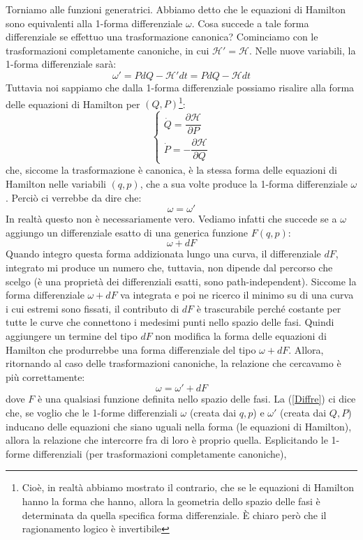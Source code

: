\documentclass[a4paper,openany]{article}
\begin{document}
Torniamo alle funzioni generatrici. Abbiamo detto che le equazioni di Hamilton sono equivalenti alla 1-forma differenziale $\omega$. Cosa succede a tale forma differenziale se effettuo una trasformazione canonica? Cominciamo con le trasformazioni completamente canoniche, in cui $\mathcal{H}' = \mathcal{H}$. Nelle nuove variabili, la 1-forma differenziale sarà:
$$
\omega' = PdQ-\mathcal{H}'dt =  PdQ-\mathcal{H}dt
$$
Tuttavia noi sappiamo che dalla 1-forma differenziale possiamo risalire alla forma delle equazioni di Hamilton per $(Q,P)$\footnote{Cioè, in realtà abbiamo mostrato il contrario, che se le equazioni di Hamilton hanno la forma che hanno, allora la geometria dello spazio delle fasi è determinata da quella specifica forma differenziale. È chiaro però che il ragionamento logico è invertibile}:
\begin{equation}\label{key}
	\begin{cases}
		\dot{Q} = \dfrac{\partial \mathcal{H}}{\partial P} \\
		\dot{P} = -\dfrac{\partial \mathcal{H}}{\partial Q}
	\end{cases}
\end{equation}
che, siccome la trasformazione è canonica, è la stessa forma delle equazioni di Hamilton nelle variabili $(q,p)$, che a sua volte produce la 1-forma differenziale $\omega$. Perciò ci verrebbe da dire che:
$$
\omega = \omega'
$$
In realtà questo non è necessariamente vero. Vediamo infatti che succede se a $\omega$ aggiungo un differenziale esatto di una generica funzione $F(q,p)$:
$$
\omega + dF
$$
Quando integro questa forma addizionata lungo una curva, il differenziale $dF$, integrato mi produce un numero che, tuttavia, non dipende dal percorso che scelgo (è una proprietà dei differenziali esatti, sono path-independent). Siccome la forma differenziale $\omega+dF$ va integrata e poi ne ricerco il minimo su di una curva i cui estremi sono fissati, il contributo di $dF$ è trascurabile perché costante per tutte le curve che connettono i medesimi punti nello spazio delle fasi. Quindi aggiungere un termine del tipo $dF$ non modifica la forma delle equazioni di Hamilton che produrrebbe una forma differenziale del tipo $\omega + dF$. Allora, ritornando al caso delle trasformazioni canoniche, la relazione che cercavamo è più correttamente:
\begin{equation}
	\omega = \omega' + dF
	\label{Diffre}
\end{equation}
dove $F$ è una qualsiasi funzione definita nello spazio delle fasi. La (\ref{Diffre}) ci dice che, se voglio che le 1-forme differenziali $\omega$ (creata dai $q,p$) e $\omega'$ (creata dai $Q,P$) inducano delle equazioni che siano uguali nella forma (le equazioni di Hamilton), allora la relazione che intercorre fra di loro è proprio quella. Esplicitando le 1-forme differenziali (per trasformazioni completamente canoniche),
\end{document}
